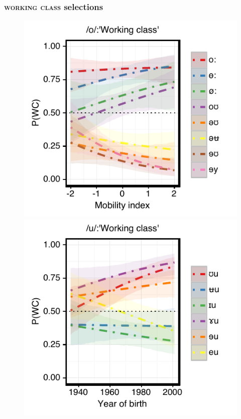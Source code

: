 \documentclass[PWPL]{article}
\begin{document}
\subsubsection{\textsc{working class} selections}
\begin{figure}[ht]
\centering
\includegraphics[scale=0.8]{ow_class_dim3.pdf}
\includegraphics[scale=0.8]{uw_class_age.pdf}
\end{figure}
\end{document}
